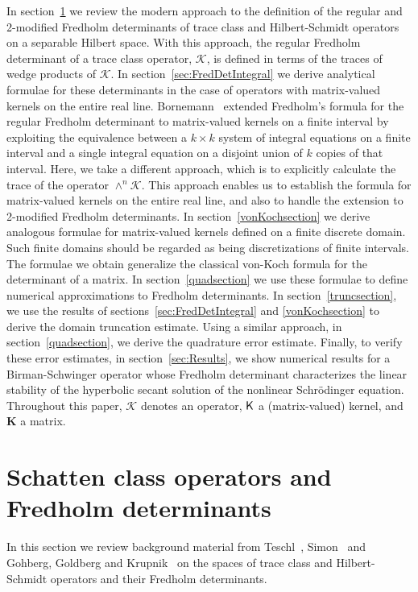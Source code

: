 \documentclass{birkjour}
\theoremstyle{definition}
\theoremstyle{remark}
\numberwithin{equation}{section}
\begin{document}
In section~\ref{sec:SchattenFred} we review the modern approach to the definition of the regular and 2-modified Fredholm determinants of trace class and Hilbert-Schmidt operators on a separable Hilbert space. With this approach, the regular Fredholm determinant of a
trace class operator,
$\mathcal K$, is defined 
in terms of the traces of  wedge products of $\mathcal K$.
In section~\ref{sec:FredDetIntegral} we 
derive analytical formulae for these  determinants in the case of 
operators with matrix-valued kernels on the entire real line. 
Bornemann~\cite{Bornemann} extended Fredholm's formula for the regular Fredholm determinant to matrix-valued kernels on a finite interval 
 by exploiting the equivalence between a $k\times k$
system of integral equations on a finite interval and a single integral equation on a 
disjoint union of $k$ copies of that interval.
Here, we take a different approach, which is to explicitly calculate the trace
of the operator ${\wedge}^n\mathcal{K}$. 
This approach enables us to establish the
formula for matrix-valued kernels on the entire real line, and also to handle
the extension to 2-modified Fredholm determinants.
 In section~\ref{vonKochsection}
we derive analogous formulae for  matrix-valued kernels defined on a finite discrete domain.
Such finite domains should be regarded as being discretizations of  finite intervals.
The formulae we obtain generalize the classical von-Koch formula for the determinant of a matrix.
In section~\ref{quadsection} we use these formulae  to define numerical approximations to  Fredholm determinants.
In section~\ref{truncsection}, we use the results of sections~\ref{sec:FredDetIntegral} and \ref{vonKochsection} to 
derive the domain truncation estimate. 
 Using a similar approach, in section~\ref{quadsection}, we derive the quadrature error
 estimate.
 Finally, to verify these error estimates, in section~\ref{sec:Results}, we show numerical results for a Birman-Schwinger operator
whose Fredholm determinant characterizes the linear stability of the hyperbolic secant
solution of the nonlinear Schr\"odinger equation. 
Throughout this paper, $\mathcal K$ denotes an operator, $\textsf K$ a (matrix-valued) kernel,
and $\mathbf K$ a matrix. 


 \section{Schatten class operators and Fredholm determinants}\label{sec:SchattenFred}

In this section we review background material from 
Teschl~\cite{TeschlFA}, Simon~\cite{Simon} and 
Gohberg, Goldberg and Krupnik~\cite{GGK}
on the spaces of  trace class and Hilbert-Schmidt operators and  their Fredholm determinants. 
\end{document}
